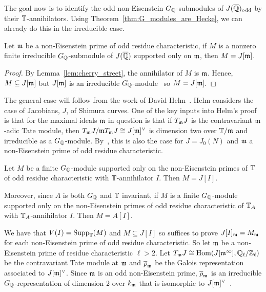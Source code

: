\documentclass[11pt, proquest]{uwthesis}
\begin{document}
The goal now is to identify the odd non-Eisenstein $G_{\mathbb{Q}}$-submodules of
$J(\overline{\mathbb{Q}})_{\mathrm{odd}}$ by their $\mathbb{T}$-annihilators. Using
Theorem~\ref{thm:G_modules_are_Hecke}, we can already do this in the
irreducible case.
\begin{corollary}
    Let $\mathfrak{m}$ be a non-Eisenstein prime of odd residue characteristic, if $M$ is
    a nonzero finite irreducible $G_{\mathbb{Q}}$-submodule of $J(\overline{\mathbb{Q}})$ supported
    only on $\mathfrak{m}$, then $M=J[\mathfrak{m}]$.
\end{corollary}
\begin{proof}
    By Lemma~\ref{lem:cherry_street}, the annihilator of $M$ is $\mathfrak{m}$. Hence,
    $M\subseteq J[\mathfrak{m}]$ but $J[\mathfrak{m}]$ is an irreducible
    $G_{\mathbb{Q}}$-module~\cite[Proposition 14.2]{mazur:eisenstein} so $M=J[\mathfrak{m}]$.
\end{proof}

The general case will follow from the work of David Helm~\cite{helm:jacobian}.
Helm considers the case of Jacobians, $J$, of Shimura curves. One of the key
inputs into Helm's proof is that for the maximal ideals $\mathfrak{m}$ in question is
that if $T_{\mathfrak{m}} J$ is the contravariant $\mathfrak{m}$-adic Tate module, then $T_{\mathfrak{m}} J/\mathfrak{m}
T_{\mathfrak{m}} J\cong J[\mathfrak{m}]^\vee$ is dimension two over $\mathbb{T}/\mathfrak{m}$ and irreducible as a
$G_{\mathbb{Q}}$-module. By~\cite[Prop. 14.2]{mazur:eisenstein}, this is also the case
for $J=J_0(N)$ and $\mathfrak{m}$ a non-Eisenstein prime of odd residue characteristic.

\begin{theorem}%
    \label{thm:non_eisenstein_kernel_hecke}
    Let $M$ be a finite $G_{\mathbb{Q}}$-module supported only on the non-Eisenstein
    primes of $\mathbb{T}$ of odd residue characteristic with $\mathbb{T}$-annihilator $I$.
    Then $M=J[I]$.

    Moreover, since $A$ is both $G_{\mathbb{Q}}$ and $\mathbb{T}$ invariant, if $M$ is a finite
    $G_{\mathbb{Q}}$-module supported only on the non-Eisenstein primes of odd residue
    characteristic of $\mathbb{T}_A$ with $\mathbb{T}_A$-annihilator $I$. Then $M=A[I]$.
\end{theorem}

We have that $V(I)=\operatorname{Supp}_{\mathbb{T}}(M)$ and $M\subseteq J[I]$ so suffices to prove
$J[I]_{\mathfrak{m}} = M_{\mathfrak{m}}$ for each non-Eisenstein prime of odd residue characteristic.
So let $\mathfrak{m}$ be a non-Eisenstein prime of residue characteristic $\ell>2$. Let
$T_{\mathfrak{m}} J\cong \operatorname{Hom}(J[\mathfrak{m}^\infty], \mathbb{Q}_\ell/\mathbb{Z}_\ell)$ be the contravariant Tate
module at $\mathfrak{m}$ and $\overline{\rho}_{\mathfrak{m}}$ be the Galois representation associated
to $J[\mathfrak{m}]^\vee$. Since $\mathfrak{m}$ is an odd non-Eisenstein prime,
$\overline{\rho}_{\mathfrak{m}}$ is an irreducible $G_{\mathbb{Q}}$-representation of dimension 2
over $k_{\mathfrak{m}}$ that is isomorphic to $J[\mathfrak{m}]^\vee$~\cite[Prop.
14.2]{mazur:eisenstein}.
\end{document}
